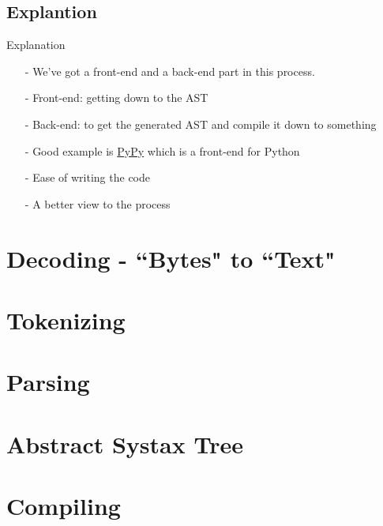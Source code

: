 \documentclass[aspectratio=169, dvipsnames, svgnames, x11names]{beamer}
\begin{document}
\subsection{Explantion}
\begin{frame}{Explanation}
\begin{itemize}
\item[-]
We’ve got a front-end and a back-end part in this process.

\item[-]
Front-end: getting down to the AST

\item[-]
Back-end: to get the generated AST and compile it down to something

\item[-]
Good example is \href{https://www.pypy.org/}{PyPy} which is a front-end for Python

\item[-]
Ease of writing the code

\item[-]
A better view to the process
\end{itemize}
\end{frame}

\section{Decoding - ``Bytes" to ``Text"}
\section{Tokenizing}
\section{Parsing}
\section{Abstract Systax Tree}
\section{Compiling}
\end{document}
